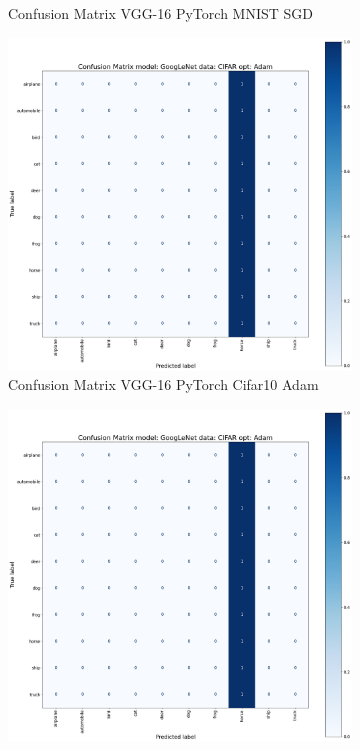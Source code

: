 \documentclass[conference]{IEEEtran}
\begin{document}
\begin{figure}[!htbp]
\begin{subfigure}[b]{0.22\textwidth}
        \caption{Confusion Matrix VGG-16 PyTorch MNIST SGD}
        \label{fig:x matrix_GG-16_PyTorch_MNIST_SGD}
    \end{subfigure}
    \begin{subfigure}[b]{0.22\textwidth}
        \centering
        \includegraphics[width=\textwidth]{img/matrix_sample.png}
        \caption{Confusion Matrix VGG-16 PyTorch Cifar10 Adam}
        \label{fig:x matrix_VGG-16_PyTorch_CIFAR_Adam}
    \end{subfigure}
    \hfill
    \begin{subfigure}[b]{0.22\textwidth}
        \centering
        \includegraphics[width=\textwidth]{img/matrix_sample.png}

\end{subfigure}
\end{figure}
\end{document}
